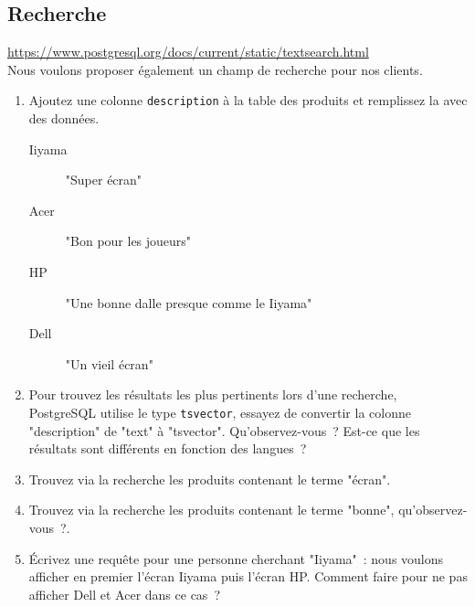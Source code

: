 \documentclass[a4paper,10pt]{article}
\begin{document}
  \subsection{Recherche}
    \url{https://www.postgresql.org/docs/current/static/textsearch.html} \\

    Nous voulons proposer également un champ de recherche pour nos clients.

   \begin{enumerate}
     \item Ajoutez une colonne \texttt{description} à la table des produits et remplissez la avec des données.
     \begin{description}
         \item[Iiyama] "Super écran"
         \item[Acer] "Bon pour les joueurs"
         \item[HP] "Une bonne dalle presque comme le Iiyama"
         \item[Dell] "Un vieil écran"
    \end{description}
     \item Pour trouvez les résultats les plus pertinents lors d'une recherche, PostgreSQL utilise le type \texttt{tsvector}, essayez de convertir la colonne "description" de "text" à "tsvector". Qu'observez-vous ? Est-ce que les résultats sont différents en fonction des langues ?
     \item Trouvez via la recherche les produits contenant le terme "écran".
     \item Trouvez via la recherche les produits contenant le terme "bonne", qu'observez-vous ?.
     \item Écrivez une requête pour une personne cherchant "Iiyama" : nous voulons afficher en premier l'écran Iiyama puis l'écran HP. Comment faire pour ne pas afficher Dell et Acer dans ce cas ?
   \end{enumerate}
\end{document}
